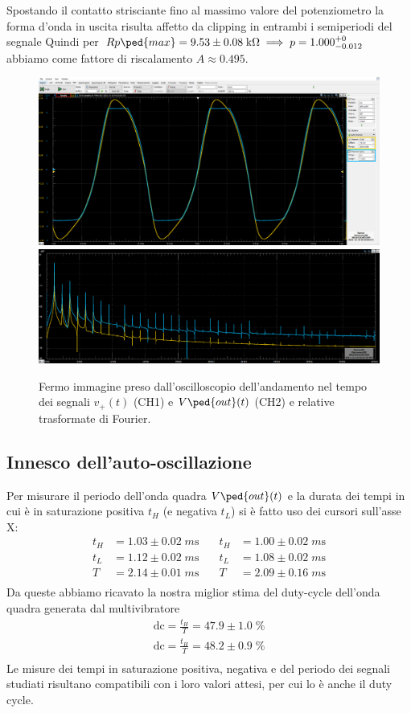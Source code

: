 \documentclass[10pt, a4paper, italian]{article}
\begin{document}
Spostando il contatto strisciante fino al massimo valore del potenziometro
la forma d'onda in uscita risulta affetto da clipping in entrambi i semiperiodi
del segnale
Quindi per
$Rp\ped{max} = 9.53 \pm 0.08 \; \si{k\ohm} \implies p = 1.000^{+0}_{-0.012}$ 
abbiamo come fattore di riscalamento $A \approx 0.495$. 
\begin{figure}[htbp]
	\centering
	\includegraphics[scale=0.335]{Rpmax1.5V}
	\includegraphics[scale=0.37]{Rpmax1.5Vfft}
	\caption{Fermo immagine preso dall'oscilloscopio dell'andamento nel tempo dei
	segnali $v_+ (t)$ (CH1) e $V\ped{out} (t)$ (CH2) e relative trasformate di
	Fourier. \label{fig: Rpmax}}
\end{figure}

\subsection{Innesco dell'auto-oscillazione}
Per misurare il periodo dell'onda quadra $V\ped{out} (t)$ e la durata dei
tempi in cui è in saturazione positiva $t_H$ (e negativa $t_L$) si è fatto
uso dei cursori sull'asse X:
\begin{align*}
t_H &= 1.03 \pm 0.02 \; \si{m\s} &\quad t_H &= 1.00 \pm 0.02 \; \si{m\s} \\
t_L &= 1.12 \pm 0.02 \; \si{m\s} &\quad t_L &= 1.08 \pm 0.02 \; \si{m\s} \\
T &= 2.14 \pm 0.01 \; \si{m\s}  &\quad T &= 2.09 \pm 0.16 \; \si{m\s} \\
\end{align*}
Da queste abbiamo ricavato la nostra miglior stima del duty-cycle dell'onda
quadra generata dal multivibratore
\begin{align*}
\mathrm{dc} = \frac{t_H}{T} = 47.9 \pm 1.0 \; \% \\
\mathrm{dc} = \frac{t_H}{T} = 48.2 \pm 0.9 \; \% \\
\end{align*}
Le misure dei tempi in saturazione positiva, negativa e del periodo dei
segnali studiati risultano compatibili con i loro valori attesi, per cui
lo è anche il duty cycle.
\end{document}
